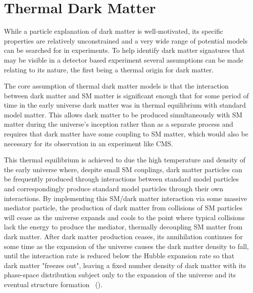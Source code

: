 \section{Thermal Dark Matter}
While a particle explanation of dark matter is well-motivated, its specific properties are relatively unconstrained and a very wide range of potential models can be searched for in experiments.
To help identify dark matter signatures that may be visible in a detector based experiment several assumptions can be made relating to its nature, the first being a thermal origin for dark matter.

The core assumption of thermal dark matter models is that the interaction between dark matter and SM matter is significant enough that for some period of time in the early universe dark matter was in thermal equilibrium with standard model matter.
This allows dark matter to be produced simultaneously with SM matter during the universe's inception rather than as a separate process and requires that dark matter have some coupling to SM matter, which would also be necessary for its observation in an experiment like CMS.

This thermal equilibrium is achieved to due the high temperature and density of the early universe where, despite small SM couplings, dark matter particles can be frequently produced through interactions between standard model particles and correspondingly produce standard model particles through their own interactions.
By implementing this SM/dark matter interaction via some massive mediator particle, the production of dark matter from collisions of SM particles will cease as the universe expands and cools to the point where typical collisions lack the energy to produce the mediator, thermally decoupling SM matter from dark matter.
After dark matter production ceases, its annihilation continues for some time as the expansion of the universe causes the dark matter density to fall, until the interaction rate is reduced below the Hubble expansion rate so that dark matter "freezes out", leaving a fixed number density of dark matter with its phase-space distribution subject only to the expansion of the universe and its eventual structure formation~\cite{thermalDM} ().

